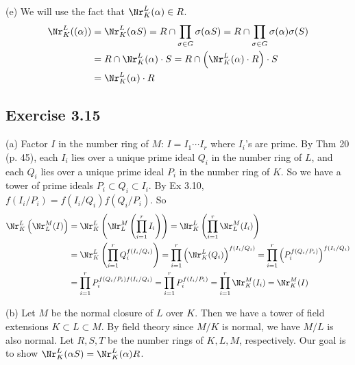 \documentclass[../Chapter.tex]{subfiles}
\begin{document}
(e) We will use the fact that $\Nr^L_K(\alpha)\in R$.
\begin{align*}
\Nr^L_K((\alpha)) &= \Nr^L_K(\alpha S) = R\cap \prod_{\sigma\in G}\sigma(\alpha S) = R\cap \prod_{\sigma\in G}\sigma(\alpha)\sigma(S) \\
&= R\cap \Nr^L_K(\alpha)\cdot S = R\cap\left(\Nr^L_K(\alpha)\cdot R\right)\cdot S \\
&= \Nr^L_K(\alpha)\cdot R
\end{align*}

\subsection*{Exercise 3.15}

(a) Factor $I$ in the number ring of $M$: $I=I_1\cdots I_r$ where $I_i$'s are prime. By Thm 20 (p. 45), each $I_i$ lies over a unique prime ideal $Q_i$ in the number ring of $L$, and each $Q_i$ lies over a unique prime ideal $P_i$ in the number ring of $K$. So we have a tower of prime ideals $P_i\subset Q_i\subset I_i$. By Ex 3.10, $f(I_i/P_i)=f(I_i/Q_i)f(Q_i/P_i)$. So
\begin{align*}
\Nr^L_K\left(\Nr^M_L(I)\right) &= \Nr^L_K\left(\Nr^M_L\left(\prod_{i=1}^r I_i\right)\right) = \Nr^L_K\left(\prod_{i=1}^r \Nr^M_L(I_i)\right) \\ 
&= \Nr^L_K\left(\prod_{i=1}^r Q_i^{f(I_i/Q_i)}\right) = \prod_{i=1}^r \left(\Nr^L_K(Q_i)\right)^{f(I_i/Q_i)} = \prod_{i=1}^r \left(P_i^{f(Q_i/P_i)}\right)^{f(I_i/Q_i)} \\
&= \prod_{i=1}^r P_i^{f(Q_i/P_i)f(I_i/Q_i)} = \prod_{i=1}^r P_i^{f(I_i/P_i)} = \prod_{i=1}^r \Nr^M_K(I_i) = \Nr^M_K(I)
\end{align*}

(b) Let $M$ be the normal closure of $L$ over $K$. Then we have a tower of field extensions $K\subset L\subset M$. By field theory since $M/K$ is normal, we have $M/L$ is also normal. Let $R,S,T$ be the number rings of $K,L,M$, respectively. Our goal is to show $\Nr^L_K(\alpha S)=\Nr^L_K(\alpha)R$.
\end{document}
